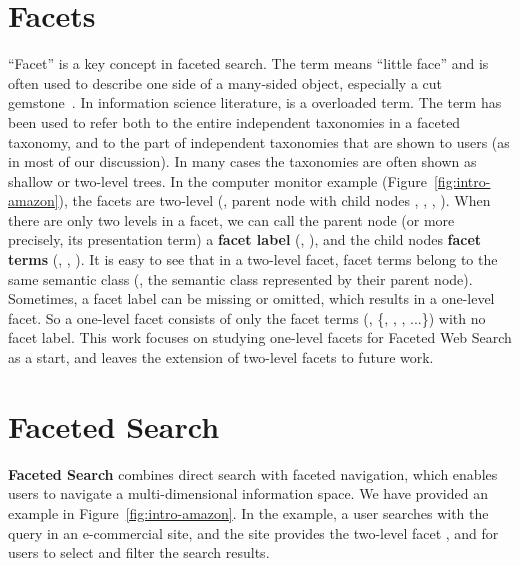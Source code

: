 \section{Facets}
``Facet'' is a key concept in faceted search. The term  means ``little face'' and is often used to describe one side of a many-sided object, especially a cut gemstone~\cite{teevan2008challenges}. In information science literature,  is a overloaded term. The term has been used to refer both to the entire independent taxonomies in a faceted taxonomy, and to the part of independent taxonomies that are shown to users (as in most of our discussion). In many cases the taxonomies are often shown as shallow or two-level trees. In the computer monitor example (Figure~\ref{fig:intro-amazon}), the facets are two-level (\eg, parent node  with child nodes , , , ). When there are only two levels in a facet, we can call the parent node (or more precisely, its presentation term) a \textbf{facet label} (\eg, ), and the child nodes \textbf{facet terms} (\eg, , ). It is easy to see that in a two-level facet, facet terms belong to the same semantic class (\ie, the semantic class represented by their parent node). Sometimes, a facet label can be missing or omitted, which results in a one-level facet. So a one-level facet consists of only the facet terms (\eg, \{, , , ...\}) with no facet label. This work focuses on studying one-level facets for Faceted Web Search as a start, and leaves the extension of two-level facets to future work.


\section{Faceted Search}
\label{sec:background-fs}
\textbf{Faceted Search} combines direct search with faceted navigation, which enables users to navigate a multi-dimensional information space. We have provided an example in Figure~\ref{fig:intro-amazon}. In the example, a user searches with the query  in an e-commercial site, and the site provides the two-level facet ,  and  for users to select and filter the search results.

